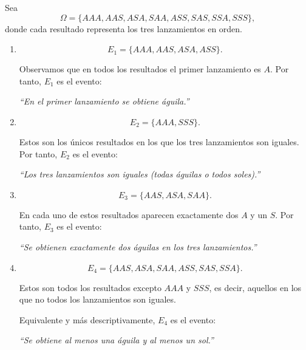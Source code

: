 \documentclass[12pt,a4paper]{article}
\begin{document}
    \begin{solucion}
        Sea
        \[
            \Omega=\{AAA, AAS, ASA, SAA, ASS, SAS, SSA, SSS\},
        \]
        donde cada resultado representa los tres lanzamientos en orden.
    
        \begin{enumerate}[label=(\alph*)]
    
            \item 
            \[
                E_1=\{AAA, AAS, ASA, ASS\}.
            \]
    
            Observamos que en todos los resultados el primer lanzamiento es $A$.
            Por tanto, $E_1$ es el evento:
    
            \emph{“En el primer lanzamiento se obtiene águila.”}
    
            \item 
            \[
                E_2=\{AAA, SSS\}.
            \]
    
            Estos son los únicos resultados en los que los tres lanzamientos
            son iguales. Por tanto, $E_2$ es el evento:
    
            \emph{“Los tres lanzamientos son iguales (todas águilas o todos soles).”}
    
            \item 
            \[
                E_3=\{AAS, ASA, SAA\}.
            \]
    
            En cada uno de estos resultados aparecen exactamente dos $A$
            y un $S$. Por tanto, $E_3$ es el evento:
    
            \emph{“Se obtienen exactamente dos águilas en los tres lanzamientos.”}
    
            \item 
            \[
                E_4=\{AAS, ASA, SAA, ASS, SAS, SSA\}.
            \]
    
            Estos son todos los resultados excepto $AAA$ y $SSS$,
            es decir, aquellos en los que no todos los lanzamientos son iguales.
    
            Equivalente y más descriptivamente, $E_4$ es el evento:
    
            \emph{“Se obtiene al menos una águila y al menos un sol.”}
    
        \end{enumerate}
    \end{solucion}
\end{document}
